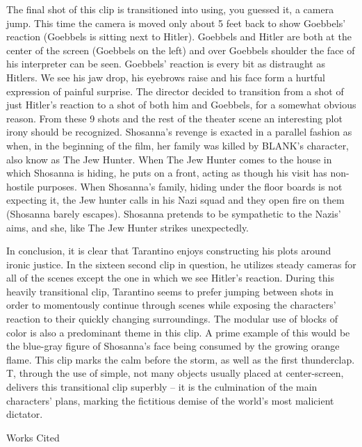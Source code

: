 \documentclass[12pt]{article}
\newenvironment{workscited}{\newpage \begin{center} Works Cited \end{center}}{\newpage }
\begin{document}
\begin{flushleft}
                                                                    The final shot of this clip is transitioned into using, you guessed it, a camera jump. This time the camera is moved only about 5 feet back to show Goebbels' reaction (Goebbels is sitting next to Hitler). Goebbels and Hitler are both at the center of the screen (Goebbels on the left) and over Goebbels shoulder the face of his interpreter can be seen. Goebbels' reaction is every bit as distraught as Hitlers. We see his jaw drop, his eyebrows raise and his face form a hurtful expression of painful surprise.
                                                                        The director decided to transition from a shot of just Hitler's reaction to a shot of both him and Goebbels, for a somewhat obvious reason. 
                                                                            From these 9 shots and the rest of the theater scene an interesting plot irony should be recognized.  Shosanna's revenge is exacted in a parallel fashion as when, in the beginning of the film, her family was killed by BLANK's character, also know as The Jew Hunter. When The Jew Hunter comes to the house in which  Shosanna is hiding, he puts on a front, acting as though his visit has non-hostile purposes. When  Shosanna's family, hiding under the floor boards is not expecting it, the Jew hunter calls in his Nazi squad and they open fire on them (Shosanna barely escapes). Shosanna pretends to be sympathetic to the Nazis' aims, and she, like The Jew Hunter strikes unexpectedly.


In conclusion, it is clear that Tarantino enjoys constructing his plots around ironic justice. In the 
sixteen second clip in question, he utilizes steady cameras for all of the scenes except the one 
in which we see Hitler's reaction. During this heavily transitional clip, Tarantino seems to 
prefer jumping between shots in order to momentously continue through scenes while exposing the 
characters' reaction to their quickly changing surroundings. The modular use of blocks of 
color is also a predominant theme in this clip. A prime example of this would be the 
blue-gray figure of Shosanna's face being consumed by the growing orange flame. This 
clip marks the calm before the storm, as well as the first thunderclap. T, 
through the use of simple, not many objects usually placed at center-screen, 
delivers this transitional clip superbly – it is the culmination of the main characters' 
plans, marking the fictitious demise of the world's most malicient dictator.



\begin{workscited}


\end{workscited}

\end{flushleft}
\end{document}
